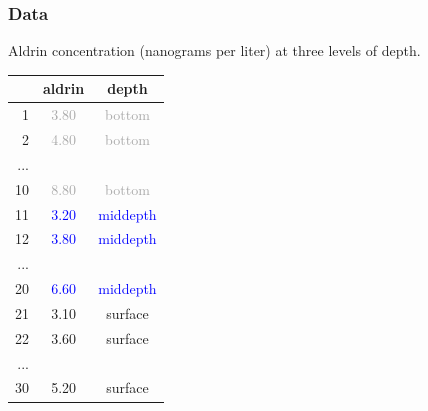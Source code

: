 \documentclass[notes,11pt, aspectratio=169]{beamer}
\begin{document}

\begin{frame}
\frametitle{Data}

Aldrin concentration (nanograms per liter) at three levels of depth. \\

\begin{center}
\begin{tabular}{r | c | c}
\hline
 	& aldrin 					& depth \\ 
\hline
1 	& \textcolor{darkGray}{3.80} 	& \textcolor{darkGray}{bottom}  \\ 
2 	& \textcolor{darkGray}{4.80} 	& \textcolor{darkGray}{bottom}  \\ 
...	&						& \\
10	& \textcolor{darkGray}{8.80} 	& \textcolor{darkGray}{bottom} \\
11	& \textcolor{blue}{3.20} 		& \textcolor{blue}{middepth}  \\
12	& \textcolor{blue}{3.80} 		& \textcolor{blue}{middepth} \\
...	&						& \\
20 	& \textcolor{blue}{6.60} 		& \textcolor{blue}{middepth} \\
21	& \textcolor{oiB}{3.10} 		& \textcolor{oiB}{surface} \\
22	& \textcolor{oiB}{3.60} 		& \textcolor{oiB}{surface} \\
...	&						& \\
30 	& \textcolor{oiB}{5.20} 		& \textcolor{oiB}{surface} \\  
\hline
\end{tabular}
\end{center}

\end{frame}

\end{document}
